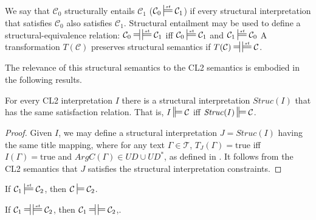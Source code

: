 \documentclass{IOS-Book-Article}
\newcommand{\corp}{ \mathcal{C} }
\newcommand{\texts}{ \mathcal{T} }
\newcommand{\Struc}{\mathit{Struc}}
\newcommand{\true}{\mathrm{true}}
\newcommand{\mdpf}{\ensuremath{\sdtstile[ss]{}{}}}
\newcommand{\smdpf}{\ensuremath{\ddtstile[ss]{}{}}}
\newcommand{\Sat}[2]{{#1}\smdpf{#2}}
\newcommand{\mdpfEquiv}{\ensuremath{\ndststile[ss]{\hspace*{3 pt }}{}\hspace*{3 pt}\sdtstile[ss]{}{}}}
\newcommand{\mdpfstruct}{\ensuremath{\sdtstile[ss]{}{st}}}
\newcommand{\mdpfstructEquiv}{\ensuremath{\ndststile[ss]{\hspace*{3 pt }}{}\hspace*{3 pt}\sdtstile[ss]{}{st}}}
\begin{document}
We say that $\corp_0$ structurally entails $\corp_1$ ($\corp_0\mdpfstruct\corp_1$) if every structural interpretation that satisfies $\corp_0$ also satisfies $\corp_1$. Structural entailment may be used to define a structural-equivalence relation:
$\corp_0\mdpfstructEquiv\corp_1$ iff $\corp_0\mdpfstruct\corp_1$ and $\corp_1\mdpfstruct\corp_0$
A transformation $T(\corp)$ preserves structural semantics if $T(\corp)\mdpfstructEquiv\corp$.

The relevance of this structural semantics to the CL2 semantics is embodied in the following results.
\begin{theo}
\label{preinterp}
For every CL2 interpretation $I$ there is a structural interpretation $\Struc(I)$ that has the same satisfaction relation. That is, $\Sat{I}{\corp}$ iff $\Sat{\Struc(I)}{\corp}$.
\begin{proof} Given $I$, we may define a structural interpretation $J = \Struc(I)$ having the same title mapping, where for any text $\Gamma\in\texts$, $T_J(\Gamma)=\true$ iff $I(\Gamma)=\true$ and $ArgC(\Gamma)\in UD \cup UD^*$, as defined in \cite{CDv2}. 
It follows from the CL2 semantics that $J$ satisfies the structural interpretation constraints. 
\end{proof}
\end{theo}

\begin{cor}
\label{preentail}
If $\corp_1\mdpfstruct\corp_2$, then $\corp\mdpf\corp_2$.
\end{cor}

\begin{cor}
\label{preequiv}
If $\corp_1\mdpfstructEquiv\corp_2$, then $\corp_1\mdpfEquiv\corp_2$,.
\end{cor}
\end{document}
